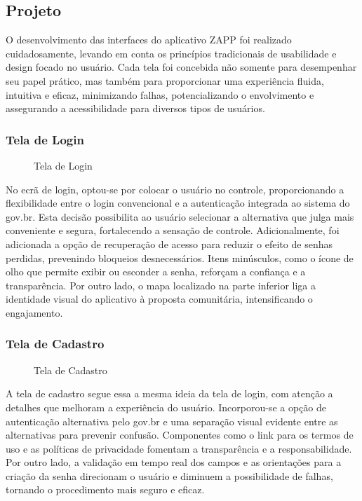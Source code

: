 \documentclass[a5paper, 12pt]{article}
\begin{document}
\subsection{Projeto}
O desenvolvimento das interfaces do aplicativo ZAPP foi realizado cuidadosamente, levando em conta os princípios tradicionais de usabilidade e design focado no usuário.  Cada tela foi concebida não somente para desempenhar seu papel prático, mas também para proporcionar uma experiência fluida, intuitiva e eficaz, minimizando falhas, potencializando o envolvimento e assegurando a acessibilidade para diversos tipos de usuários.

\subsubsection{Tela de Login}

\begin{figure}[H]
  \centering
  \caption{Tela de Login}
  \label{fig:login}
\end{figure}

No ecrã de login, optou-se por colocar o usuário no controle, proporcionando a flexibilidade entre o login convencional e a autenticação integrada ao sistema do gov.br.  Esta decisão possibilita ao usuário selecionar a alternativa que julga mais conveniente e segura, fortalecendo a sensação de controle.  Adicionalmente, foi adicionada a opção de recuperação de acesso para reduzir o efeito de senhas perdidas, prevenindo bloqueios desnecessários.  Itens minúsculos, como o ícone de olho que permite exibir ou esconder a senha, reforçam a confiança e a transparência. Por outro lado, o mapa localizado na parte inferior liga a identidade visual do aplicativo à proposta comunitária, intensificando o engajamento.

\subsubsection{Tela de Cadastro}

\begin{figure}[H]
  \centering
  \caption{Tela de Cadastro}
  \label{fig:cadastro}
\end{figure}

A tela de cadastro segue essa a mesma ideia da tela de login, com atenção a detalhes que melhoram a experiência do usuário. Incorporou-se a opção de autenticação alternativa pelo gov.br e uma separação visual evidente entre as alternativas para prevenir confusão.  Componentes como o link para os termos de uso e as políticas de privacidade fomentam a transparência e a responsabilidade. Por outro lado, a validação em tempo real dos campos e as orientações para a criação da senha direcionam o usuário e diminuem a possibilidade de falhas, tornando o procedimento mais seguro e eficaz.
\end{document}
